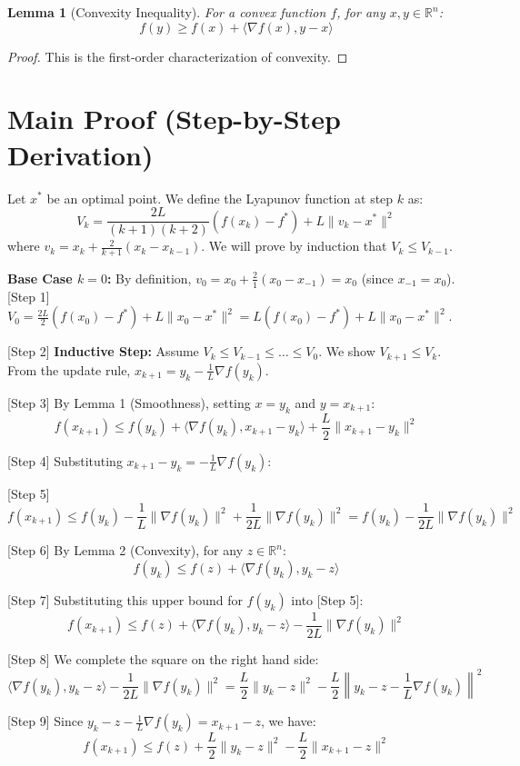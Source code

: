 \documentclass{article}
\newtheorem{lemma}[theorem]{Lemma}
\begin{document}
\begin{lemma}[Convexity Inequality]
For a convex function $f$, for any $x, y \in \mathbb{R}^n$:
$$f(y) \geq f(x) + \langle \nabla f(x), y - x \rangle$$
\end{lemma}
\begin{proof}
This is the first-order characterization of convexity.
\end{proof}

\section*{Main Proof (Step-by-Step Derivation)}
Let $x^*$ be an optimal point. We define the Lyapunov function at step $k$ as:
$$V_k = \frac{2L}{(k+1)(k+2)} \left( f(x_k) - f^* \right) + L \|v_k - x^*\|^2$$
where $v_k = x_k + \frac{2}{k+1}(x_k - x_{k-1})$. We will prove by induction that $V_k \leq V_{k-1}$.

\textbf{Base Case $k=0$:} By definition, $v_0 = x_0 + \frac{2}{1}(x_0 - x_{-1}) = x_0$ (since $x_{-1}=x_0$).
[Step 1] $V_0 = \frac{2L}{2} (f(x_0) - f^*) + L \|x_0 - x^*\|^2 = L(f(x_0) - f^*) + L\|x_0 - x^*\|^2$.

[Step 2] \textbf{Inductive Step:} Assume $V_k \leq V_{k-1} \leq \dots \leq V_0$. We show $V_{k+1} \leq V_k$.
From the update rule, $x_{k+1} = y_k - \frac{1}{L}\nabla f(y_k)$.

[Step 3] By Lemma 1 (Smoothness), setting $x=y_k$ and $y=x_{k+1}$:
$$f(x_{k+1}) \leq f(y_k) + \langle \nabla f(y_k), x_{k+1} - y_k \rangle + \frac{L}{2} \|x_{k+1} - y_k\|^2$$

[Step 4] Substituting $x_{k+1} - y_k = -\frac{1}{L}\nabla f(y_k)$:

[Step 5] $$f(x_{k+1}) \leq f(y_k) - \frac{1}{L} \|\nabla f(y_k)\|^2 + \frac{1}{2L} \|\nabla f(y_k)\|^2 = f(y_k) - \frac{1}{2L} \|\nabla f(y_k)\|^2$$

[Step 6] By Lemma 2 (Convexity), for any $z \in \mathbb{R}^n$:
$$f(y_k) \leq f(z) + \langle \nabla f(y_k), y_k - z \rangle$$

[Step 7] Substituting this upper bound for $f(y_k)$ into [Step 5]:
$$f(x_{k+1}) \leq f(z) + \langle \nabla f(y_k), y_k - z \rangle - \frac{1}{2L} \|\nabla f(y_k)\|^2$$

[Step 8] We complete the square on the right hand side:
$$\langle \nabla f(y_k), y_k - z \rangle - \frac{1}{2L} \|\nabla f(y_k)\|^2 = \frac{L}{2} \|y_k - z\|^2 - \frac{L}{2} \left\| y_k - z - \frac{1}{L} \nabla f(y_k) \right\|^2$$

[Step 9] Since $y_k - z - \frac{1}{L}\nabla f(y_k) = x_{k+1} - z$, we have:
$$f(x_{k+1}) \leq f(z) + \frac{L}{2} \|y_k - z\|^2 - \frac{L}{2} \|x_{k+1} - z\|^2$$
\end{document}
